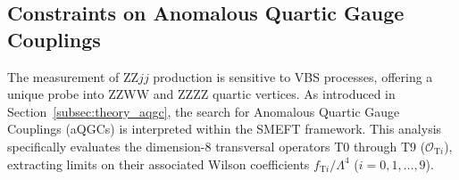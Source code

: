 
\subsection{Constraints on Anomalous Quartic Gauge Couplings}
\label{subsec:aqgc_limits}





The measurement of $\text{ZZ}jj$ production is sensitive to VBS processes, offering a unique probe into $\text{ZZWW}$ and $\text{ZZZZ}$ quartic vertices. As introduced in Section~\ref{subsec:theory_aqgc}, the search for Anomalous Quartic Gauge Couplings (aQGCs) is interpreted within the SMEFT framework. This analysis specifically evaluates the dimension-8 transversal operators $\text{T}0$ through $\text{T}9$ ($\mathcal{O}_{\text{T}i}$), extracting limits on their associated Wilson coefficients $f_{\text{T}i}/\Lambda^4$ ($i = 0, 1, \ldots, 9$).

